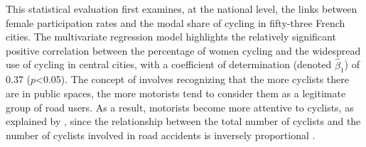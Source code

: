 \begin{refsegment}
This statistical evaluation first examines, at the national level, the links between female participation rates and the modal share of cycling in fifty-three French cities. The multivariate regression model highlights the relatively significant positive correlation between the percentage of women cycling and the widespread use of cycling in central cities, with a coefficient of determination (denoted $\hat{\beta}_{1}$) of 0.37 ($p$\textless0.05). The concept of  involves recognizing that the more cyclists there are in public spaces, the more motorists tend to consider them as a legitimate group of road users. As a result, motorists become more attentive to cyclists, as explained by \textcolor{blue}{\textcite[83]{oosteren_pourquoi_2021}}, since the relationship between the total number of cyclists and the number of cyclists involved in road accidents is inversely proportional \textcolor{blue}{\autocite[208]{jacobsen_safety_2003}}. %


\end{refsegment}
